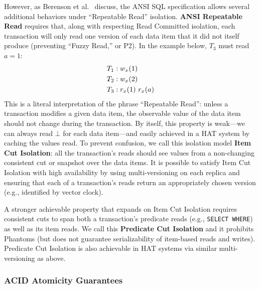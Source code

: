 However, as Berenson et al.~\cite{ansicritique} discuss, the ANSI SQL
specification allows several additional behaviors under ``Repeatable
Read'' isolation.  \textbf{ANSI Repeatable Read} requires that, along
with respecting Read Committed isolation, each transaction will only
read one version of each data item that it did not itself produce
(preventing ``Fuzzy Read,'' or P2). In the example below, $T_3$ must
read $a=1$:
\begin{align*}
\small
T_1 &: w_x(1)
\\T_2 &: w_x(2)
\\T_3 &: r_x(1)~r_x(a)
\end{align*}
This is a literal interpretation of the phrase ``Repeatable Read'':
unless a transaction modifies a given data item, the observable value
of the data item should not change during the transaction. By itself,
this property is weak---we can always read $\bot$ for each data
item---and easily achieved in a HAT system by caching the values
read. To prevent confusion, we call this isolation model \textbf{Item
  Cut Isolation}: all the transaction's reads should see values from a
non-changing consistent cut or snapshot over the data items. It is
possible to satisfy Item Cut Isolation with high availability by using
multi-versioning on each replica and ensuring that each of a
transaction's reads return an appropriately chosen version (e.g.,
identified by vector clock).

A stronger achievable property that expands on Item Cut Isolation
requires consistent cuts to span both a transaction's predicate reads
(e.g., \texttt{SELECT WHERE}) as well as its item reads.  We call this
\textbf{Predicate Cut Isolation} and it prohibits Phantoms (but does
not guarantee serializability of item-based reads and
writes). Predicate Cut Isolation is also achievable in HAT systems via
similar multi-versioning as above.

\subsubsection{ACID Atomicity Guarantees}

